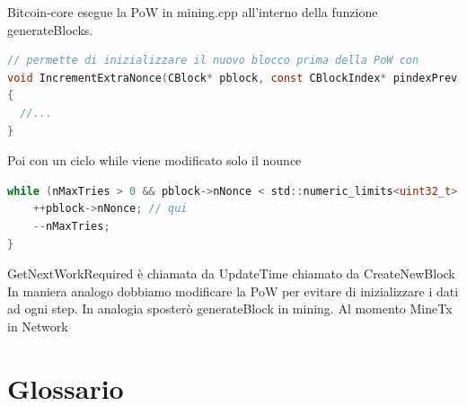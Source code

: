 \documentclass{article}
\begin{document}
Bitcoin-core esegue la PoW in mining.cpp all'interno della funzione generateBlocks.

\lstset{style=mystyle}
\begin{lstlisting}[language=c]
// permette di inizializzare il nuovo blocco prima della PoW con
void IncrementExtraNonce(CBlock* pblock, const CBlockIndex* pindexPrev, unsigned int& nExtraNonce)
{
  //...
}
\end{lstlisting}

Poi con un ciclo while viene modificato solo il nounce

\lstset{style=mystyle}
\begin{lstlisting}[language=c]
while (nMaxTries > 0 && pblock->nNonce < std::numeric_limits<uint32_t>::max() && !CheckProofOfWork(pblock->GetHash(), pblock->nBits, Params().GetConsensus()) && !ShutdownRequested()) {
    ++pblock->nNonce; // qui
    --nMaxTries;
}
\end{lstlisting}

GetNextWorkRequired è chiamata da UpdateTime chiamato da CreateNewBlock
In maniera analogo dobbiamo modificare la PoW per evitare di inizializzare i dati ad ogni step.
In analogia sposterò generateBlock in mining. Al momento MineTx in Network

\newpage
\section{Glossario}

\newpage


\end{document}
